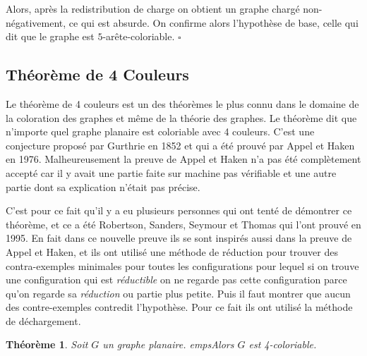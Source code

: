 \documentclass[10pt,a4paper]{article}
\newtheorem{theorem}{Théorème}
\newcommand{\ep}{{\hfill $\square$}}
\begin{document}

Alors, après la redistribution de charge on obtient un graphe chargé non-négativement, ce qui est absurde. On confirme alors l'hypothèse de base, celle qui dit que le graphe est $5$-arête-coloriable.
\ep 


\subsection{Théorème de 4 Couleurs}

Le théorème de 4 couleurs est un des théorèmes le plus connu dans le domaine de la coloration des graphes et même de la théorie des graphes. Le théorème dit que n'importe quel graphe planaire est coloriable avec 4 couleurs. C'est une conjecture proposé par Gurthrie en 1852 et qui a été prouvé par Appel et Haken en 1976. Malheureusement la preuve de Appel et Haken n'a pas été complètement accepté car il y avait une partie faite sur machine pas vérifiable et une autre partie dont sa explication n'était pas précise.

C'est pour ce fait qu'il y a eu plusieurs personnes qui ont tenté de démontrer ce théorème, et ce a été Robertson, Sanders, Seymour et Thomas qui l'ont prouvé en 1995. En fait dans ce nouvelle preuve ils se sont inspirés aussi dans la preuve de Appel et Haken, et ils ont utilisé une méthode de réduction pour trouver des contra-exemples minimales pour toutes les configurations pour lequel si on trouve une configuration qui est \emph{réductible} on ne regarde pas cette configuration parce qu'on regarde sa \emph{réduction} ou partie plus petite. Puis il faut montrer que aucun des contre-exemples contredit l'hypothèse. Pour ce fait ils ont utilisé la méthode de déchargement. 

\begin{theorem}
Soit $G$ un graphe planaire. empsAlors $G$ est 4-coloriable.
\label{th:4CT}
\end{theorem}
\end{document}
